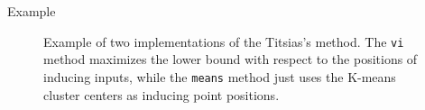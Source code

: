 		\begin{frame}{Example}
			\begin{figure}[!h]
				\centering
				\subfloat{
					\scalebox{0.5}{
						
					}
				}
				\subfloat{
					\scalebox{0.5}{
						
					}
				}
				\caption{Example of two implementations of the Titsias's method. The \lstinline{vi} method maximizes the lower bound with respect to the positions of inducing inputs, while the \lstinline{means} method just uses the K-means cluster centers as inducing point positions.}
			\end{figure}
		\end{frame}